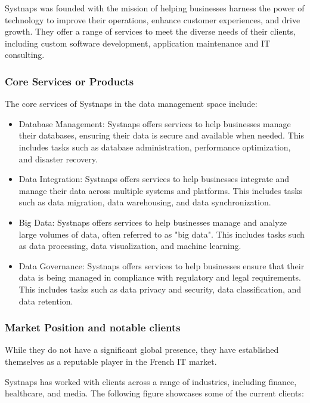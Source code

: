 Systnaps was founded with the mission of helping businesses harness the power of technology to improve their operations, enhance customer experiences, and drive growth. They offer a range of services to meet the diverse needs of their clients, including custom software development, application maintenance and IT consulting. 

\subsubsection{Core Services or Products }

The core services of Systnaps in the data management space include: 
\begin{itemize}[label={--}]
    \item Database Management: Systnaps offers services to help businesses manage their databases, ensuring their data is secure and available when needed. This includes tasks such as database administration, performance optimization, and disaster recovery. 

\item Data Integration: Systnaps offers services to help businesses integrate and manage their data across multiple systems and platforms. This includes tasks such as data migration, data warehousing, and data synchronization. 

\item Big Data: Systnaps offers services to help businesses manage and analyze large volumes of data, often referred to as "big data". This includes tasks such as data processing, data visualization, and machine learning. 

\item  Data Governance: Systnaps offers services to help businesses ensure that their data is being managed in compliance with regulatory and legal requirements. This includes tasks such as data privacy and security, data classification, and data retention. 

 \end{itemize}

\subsubsection{Market Position and notable clients }

While they do not have a significant global presence, they have established themselves as a reputable player in the French IT market. 

Systnaps has worked with clients across a range of industries, including finance, healthcare, and media. The following figure showcases some of the current clients: 


